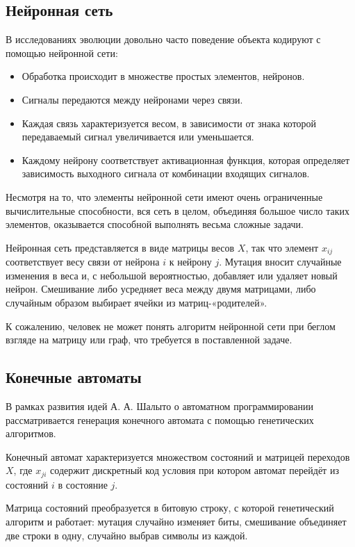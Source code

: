 \documentclass[a4paper,14pt]{extarticle}
\begin{document}
\subsection{Нейронная сеть}
В исследованиях эволюции\cite{communication} довольно часто поведение объекта 
кодируют с помощью нейронной сети:\cite{neural}
\begin{itemize}
  \item Обработка происходит в множестве простых элементов, нейронов.
  \item Сигналы передаются между нейронами через связи.
  \item Каждая связь характеризуется весом, в зависимости от знака которой
        передаваемый сигнал увеличивается или уменьшается.
  \item Каждому нейрону соответствует активационная функция, которая определяет 
        зависимость выходного сигнала от комбинации входящих сигналов.
\end{itemize}

Несмотря на то, что элементы нейронной сети имеют очень ограниченные
вычислительные способности, вся сеть в целом, объединяя большое число таких
элементов, оказывается способной выполнять весьма сложные задачи.

Нейронная сеть представляется в виде матрицы весов $X$, так что элемент
$x_{ij}$ соответствует весу связи от нейрона $i$ к нейрону $j$. Мутация
вносит случайные изменения в веса и, с небольшой вероятностью, добавляет или
удаляет новый нейрон. Смешивание либо усредняет веса между двумя матрицами, либо
случайным образом выбирает ячейки из матриц-«родителей».

К сожалению, человек не может понять алгоритм нейронной сети при беглом взгляде
на матрицу или граф, что требуется в поставленной задаче.

\subsection{Конечные автоматы}
В рамках развития идей А. А. Шалыто о автоматном программировании
рассматривается генерация конечного автомата с помощью генетических
алгоритмов.\cite{shalyto}

Конечный автомат характеризуется множеством состояний и матрицей переходов $X$,
где $x_{ji}$ содержит дискретный код условия при котором автомат перейдёт из
состояний $i$ в состояние $j$.

Матрица состояний преобразуется в битовую строку, с которой генетический
алгоритм и работает: мутация случайно изменяет биты, смешивание объединяет две
строки в одну, случайно выбрав символы из каждой.
\end{document}
